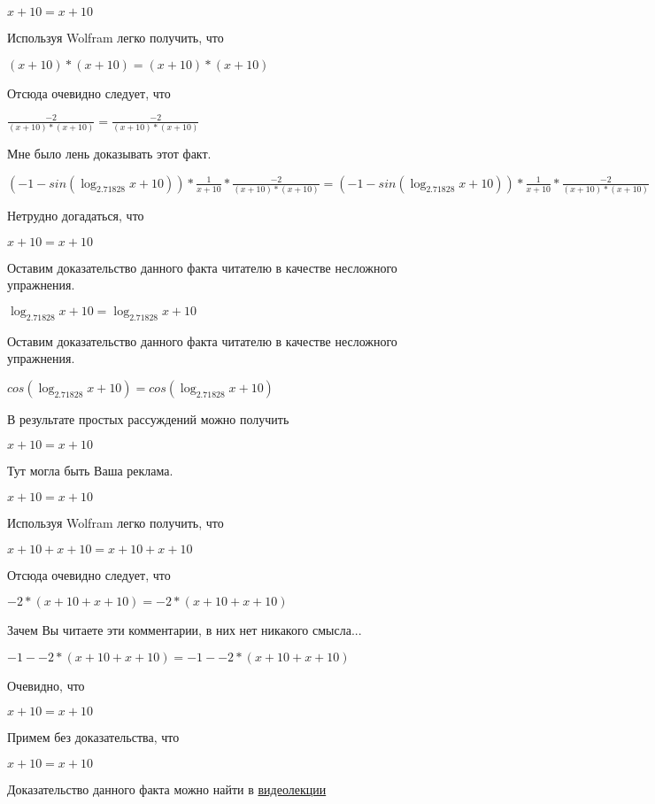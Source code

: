 \documentclass[12pt,a4paper,fleqn]{article}
\theoremstyle{definition}
\begin{document}
$ x  +  10  =  x  +  10 $

Используя Wolfram легко получить, что 

$( x  +  10 ) * ( x  +  10 ) = ( x  +  10 ) * ( x  +  10 )$

Отсюда очевидно следует, что 

$\frac{ -2 }{( x  +  10 ) * ( x  +  10 )}
 = \frac{ -2 }{( x  +  10 ) * ( x  +  10 )}
$

Мне было лень доказывать этот факт.

$( -1  - sin(\log_{ 2.71828 }{ x  +  10 })) * \frac{ 1 }{ x  +  10 }
 * \frac{ -2 }{( x  +  10 ) * ( x  +  10 )}
 = ( -1  - sin(\log_{ 2.71828 }{ x  +  10 })) * \frac{ 1 }{ x  +  10 }
 * \frac{ -2 }{( x  +  10 ) * ( x  +  10 )}
$

Нетрудно догадаться, что 

$ x  +  10  =  x  +  10 $

Оставим доказательство данного факта читателю в качестве несложного упражнения. 

$\log_{ 2.71828 }{ x  +  10 } = \log_{ 2.71828 }{ x  +  10 }$

Оставим доказательство данного факта читателю в качестве несложного упражнения. 

$cos(\log_{ 2.71828 }{ x  +  10 }) = cos(\log_{ 2.71828 }{ x  +  10 })$

В результате простых рассуждений можно получить 

$ x  +  10  =  x  +  10 $

Тут могла быть Ваша реклама. 

$ x  +  10  =  x  +  10 $

Используя Wolfram легко получить, что 

$ x  +  10  +  x  +  10  =  x  +  10  +  x  +  10 $

Отсюда очевидно следует, что 

$ -2  * ( x  +  10  +  x  +  10 ) =  -2  * ( x  +  10  +  x  +  10 )$

Зачем Вы читаете эти комментарии, в них нет никакого смысла... 

$ -1  -  -2  * ( x  +  10  +  x  +  10 ) =  -1  -  -2  * ( x  +  10  +  x  +  10 )$

Очевидно, что 

$ x  +  10  =  x  +  10 $

Примем без доказательства, что 

$ x  +  10  =  x  +  10 $

Доказательство данного факта можно найти в \href{https://www.youtube.com/watch?v=dQw4w9WgXcQ}{видеолекции} 
\end{document}
